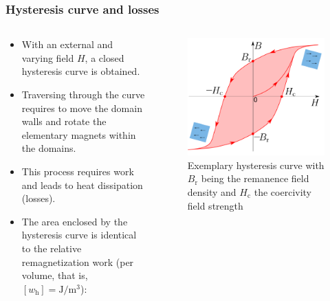 \begin{frame}
	\frametitle{Hysteresis curve and losses}
	\begin{columns}
		\begin{column}{0.5\textwidth}
            \begin{itemize}
                \item With an external and varying field $H$, a closed hysteresis curve is obtained.
                \item<2-> Traversing through the curve requires to move the domain walls and rotate the elementary magnets within the domains.
                \item<3-> This process requires work and leads to heat dissipation (losses).
                \item<4-> The area enclosed by the hysteresis curve is identical to the relative remagnetization work (per volume, that is, $[w_{\mathrm{h}}]=\si{\joule\per\metre\cubed}$):
            \end{itemize}
		\end{column}
        \hfill
		\begin{column}{0.475\textwidth}
            \vspace{-0.2cm}
			\begin{figure}
				\centering
				\includegraphics[height=0.55\textheight]{fig/lec02/Hyteresis_curve_full.pdf}
				\caption{Exemplary hysteresis curve with $B_\mathrm{r}$ being the remanence field density and $H_\mathrm{c}$ the coercivity field strength}
			\end{figure}
		\end{column}
		\end{columns}
\end{frame}

